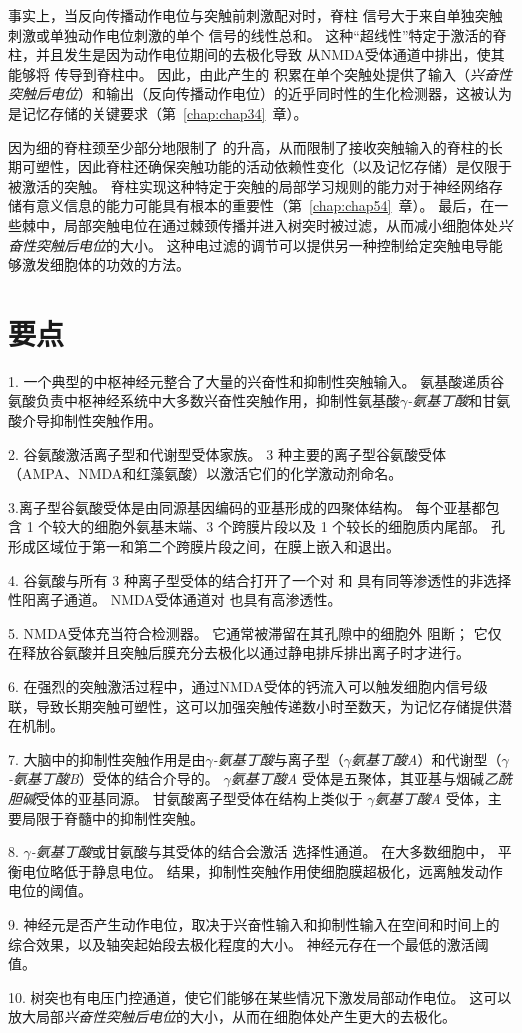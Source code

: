 事实上，当反向传播动作电位与突触前刺激配对时，脊柱  信号大于来自单独突触刺激或单独动作电位刺激的单个  信号的线性总和。
这种“超线性”特定于激活的脊柱，并且发生是因为动作电位期间的去极化导致  从NMDA受体通道中排出，使其能够将  传导到脊柱中。
因此，由此产生的  积累在单个突触处提供了输入（\textit{兴奋性突触后电位}）和输出（反向传播动作电位）的近乎同时性的生化检测器，这被认为是记忆存储的关键要求（第~\ref{chap:chap34}~章）。


因为细的脊柱颈至少部分地限制了  的升高，从而限制了接收突触输入的脊柱的长期可塑性，因此脊柱还确保突触功能的活动依赖性变化（以及记忆存储）是仅限于被激活的突触。
脊柱实现这种特定于突触的局部学习规则的能力对于神经网络存储有意义信息的能力可能具有根本的重要性（第~\ref{chap:chap54}~章）。
最后，在一些棘中，局部突触电位在通过棘颈传播并进入树突时被过滤，从而减小细胞体处\textit{兴奋性突触后电位}的大小。
这种电过滤的调节可以提供另一种控制给定突触电导能够激发细胞体的功效的方法。



\section{要点}

1. 一个典型的中枢神经元整合了大量的兴奋性和抑制性突触输入。
氨基酸递质谷氨酸负责中枢神经系统中大多数兴奋性突触作用，抑制性氨基酸\textit{$\gamma$-氨基丁酸}和甘氨酸介导抑制性突触作用。


2. 谷氨酸激活离子型和代谢型受体家族。
3 种主要的离子型谷氨酸受体（AMPA、NMDA和红藻氨酸）以激活它们的化学激动剂命名。


3.离子型谷氨酸受体是由同源基因编码的亚基形成的四聚体结构。 
每个亚基都包含 1 个较大的细胞外氨基末端、3 个跨膜片段以及 1 个较长的细胞质内尾部。
孔形成区域位于第一和第二个跨膜片段之间，在膜上嵌入和退出。


4. 谷氨酸与所有 3 种离子型受体的结合打开了一个对  和  具有同等渗透性的非选择性阳离子通道。
NMDA受体通道对  也具有高渗透性。


5. NMDA受体充当符合检测器。
它通常被滞留在其孔隙中的细胞外  阻断；
它仅在释放谷氨酸并且突触后膜充分去极化以通过静电排斥排出离子时才进行。 


6. 在强烈的突触激活过程中，通过NMDA受体的钙流入可以触发细胞内信号级联，导致长期突触可塑性，这可以加强突触传递数小时至数天，为记忆存储提供潜在机制。


7. 大脑中的抑制性突触作用是由\textit{$\gamma$-氨基丁酸}与离子型（\textit{$\gamma$氨基丁酸A}）和代谢型（\textit{$\gamma$-氨基丁酸B}）受体的结合介导的。
\textit{$\gamma$氨基丁酸A} 受体是五聚体，其亚基与烟碱\textit{乙酰胆碱}受体的亚基同源。
甘氨酸离子型受体在结构上类似于 \textit{$\gamma$氨基丁酸A} 受体，主要局限于脊髓中的抑制性突触。 


8. \textit{$\gamma$-氨基丁酸}或甘氨酸与其受体的结合会激活  选择性通道。
在大多数细胞中， 平衡电位略低于静息电位。
结果，抑制性突触作用使细胞膜超极化，远离触发动作电位的阈值。


9. 神经元是否产生动作电位，取决于兴奋性输入和抑制性输入在空间和时间上的综合效果，以及轴突起始段去极化程度的大小。
神经元存在一个最低的激活阈值。


10. 树突也有电压门控通道，使它们能够在某些情况下激发局部动作电位。
这可以放大局部\textit{兴奋性突触后电位}的大小，从而在细胞体处产生更大的去极化。






